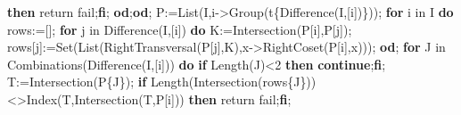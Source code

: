 \documentclass[
  10pt,
  letterpaper,
]{article}
\newenvironment{Shaded}{}{}
\newcommand{\BuiltInTok}[1]{\textcolor[rgb]{0.00,0.50,0.00}{#1}}
\newcommand{\ConstantTok}[1]{\textcolor[rgb]{0.53,0.00,0.00}{#1}}
\newcommand{\ControlFlowTok}[1]{\textcolor[rgb]{0.00,0.44,0.13}{\textbf{#1}}}
\newcommand{\ExtensionTok}[1]{#1}
\newcommand{\FloatTok}[1]{\textcolor[rgb]{0.25,0.63,0.44}{#1}}
\newcommand{\NormalTok}[1]{#1}
\newcommand{\OperatorTok}[1]{\textcolor[rgb]{0.40,0.40,0.40}{#1}}
\newcommand{\VariableTok}[1]{\textcolor[rgb]{0.10,0.09,0.49}{#1}}
\begin{document}
\begin{Shaded}
\begin{Highlighting}[]
   \ControlFlowTok{then} \ExtensionTok{return} \ConstantTok{fail}\OperatorTok{;}\ControlFlowTok{fi}\OperatorTok{;}
 \ControlFlowTok{od}\OperatorTok{;}\ControlFlowTok{od}\OperatorTok{;}
 \VariableTok{P}\OperatorTok{:=}\BuiltInTok{List}\NormalTok{(}\VariableTok{I}\OperatorTok{,}\VariableTok{i}\OperatorTok{{-}\textgreater{}}\BuiltInTok{Group}\NormalTok{(}\VariableTok{t}\NormalTok{\{}\BuiltInTok{Difference}\NormalTok{(}\VariableTok{I}\OperatorTok{,}\NormalTok{[}\VariableTok{i}\NormalTok{])\}))}\OperatorTok{;}
 \ControlFlowTok{for} \VariableTok{i} \ExtensionTok{in} \VariableTok{I} \ControlFlowTok{do}
  \VariableTok{rows}\OperatorTok{:=}\NormalTok{[]}\OperatorTok{;}
  \ControlFlowTok{for} \VariableTok{j} \ExtensionTok{in} \BuiltInTok{Difference}\NormalTok{(}\VariableTok{I}\OperatorTok{,}\NormalTok{[}\VariableTok{i}\NormalTok{]) }\ControlFlowTok{do}
   \VariableTok{K}\OperatorTok{:=}\BuiltInTok{Intersection}\NormalTok{(}\VariableTok{P}\NormalTok{[}\VariableTok{i}\NormalTok{]}\OperatorTok{,}\VariableTok{P}\NormalTok{[}\VariableTok{j}\NormalTok{])}\OperatorTok{;}
   \VariableTok{rows}\NormalTok{[}\VariableTok{j}\NormalTok{]}\OperatorTok{:=}\BuiltInTok{Set}\NormalTok{(}\BuiltInTok{List}\NormalTok{(}\BuiltInTok{RightTransversal}\NormalTok{(}\VariableTok{P}\NormalTok{[}\VariableTok{j}\NormalTok{]}\OperatorTok{,}\VariableTok{K}\NormalTok{)}\OperatorTok{,}\VariableTok{x}\OperatorTok{{-}\textgreater{}}\BuiltInTok{RightCoset}\NormalTok{(}\VariableTok{P}\NormalTok{[}\VariableTok{i}\NormalTok{]}\OperatorTok{,}\VariableTok{x}\NormalTok{)))}\OperatorTok{;}
  \ControlFlowTok{od}\OperatorTok{;}
  \ControlFlowTok{for} \VariableTok{J} \ExtensionTok{in} \BuiltInTok{Combinations}\NormalTok{(}\BuiltInTok{Difference}\NormalTok{(}\VariableTok{I}\OperatorTok{,}\NormalTok{[}\VariableTok{i}\NormalTok{])) }\ControlFlowTok{do}
   \ControlFlowTok{if} \BuiltInTok{Length}\NormalTok{(}\VariableTok{J}\NormalTok{)}\OperatorTok{\textless{}}\FloatTok{2} \ControlFlowTok{then} \ControlFlowTok{continue}\OperatorTok{;}\ControlFlowTok{fi}\OperatorTok{;}
   \VariableTok{T}\OperatorTok{:=}\BuiltInTok{Intersection}\NormalTok{(}\VariableTok{P}\NormalTok{\{}\VariableTok{J}\NormalTok{\})}\OperatorTok{;}
   \ControlFlowTok{if} \BuiltInTok{Length}\NormalTok{(}\BuiltInTok{Intersection}\NormalTok{(}\VariableTok{rows}\NormalTok{\{}\VariableTok{J}\NormalTok{\}))}\OperatorTok{\textless{}\textgreater{}}\BuiltInTok{Index}\NormalTok{(}\VariableTok{T}\OperatorTok{,}\BuiltInTok{Intersection}\NormalTok{(}\VariableTok{T}\OperatorTok{,}\VariableTok{P}\NormalTok{[}\VariableTok{i}\NormalTok{]))}
    \ControlFlowTok{then} \ExtensionTok{return} \ConstantTok{fail}\OperatorTok{;}\ControlFlowTok{fi}\OperatorTok{;}

\end{Highlighting}
\end{Shaded}
\end{document}
